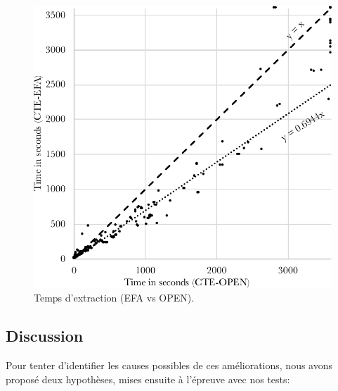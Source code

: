 \begin{figure}[ht!] \centering
\begin{center} \includegraphics[width=.45\textwidth]{figures/time-extract-efa-open3-good} \end{center}
\caption{Temps d'extraction (EFA vs OPEN).}
\label{fig:planextract}
\end{figure}

\subsection{Discussion}

Pour tenter d'identifier les causes possibles de ces améliorations, nous avons proposé deux hypothèses, mises ensuite à l'épreuve avec nos tests:

